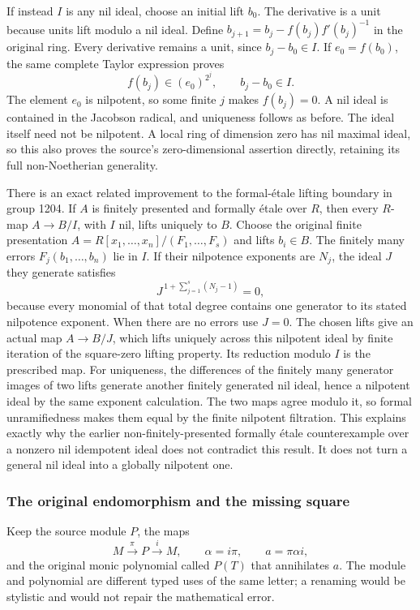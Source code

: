 If instead \(I\) is any nil ideal, choose an initial lift \(b_0\). The derivative is a unit because units lift modulo a nil ideal. Define \(b_{j+1}=b_j-f(b_j)f'(b_j)^{-1}\) in the original ring. Every derivative remains a unit, since \(b_j-b_0\in I\). If \(e_0=f(b_0)\), the same complete Taylor expression proves \[
f(b_j)\in(e_0)^{2^j},\qquad b_j-b_0\in I .
\] The element \(e_0\) is nilpotent, so some finite \(j\) makes \(f(b_j)=0\). A nil ideal is contained in the Jacobson radical, and uniqueness follows as before. The ideal itself need not be nilpotent. A local ring of dimension zero has nil maximal ideal, so this also proves the source's zero-dimensional assertion directly, retaining its full non-Noetherian generality.

There is an exact related improvement to the formal-étale lifting boundary in group 1204. If \(A\) is finitely presented and formally étale over \(R\), then every \(R\)-map \(A\to B/I\), with \(I\) nil, lifts uniquely to \(B\). Choose the original finite presentation \(A=R[x_1,\ldots,x_n]/(F_1,\ldots,F_s)\) and lifts \(b_i\in B\). The finitely many errors \(F_j(b_1,\ldots,b_n)\) lie in \(I\). If their nilpotence exponents are \(N_j\), the ideal \(J\) they generate satisfies \[
J^{\,1+\sum_{j=1}^s(N_j-1)}=0,
\] because every monomial of that total degree contains one generator to its stated nilpotence exponent. When there are no errors use \(J=0\). The chosen lifts give an actual map \(A\to B/J\), which lifts uniquely across this nilpotent ideal by finite iteration of the square-zero lifting property. Its reduction modulo \(I\) is the prescribed map. For uniqueness, the differences of the finitely many generator images of two lifts generate another finitely generated nil ideal, hence a nilpotent ideal by the same exponent calculation. The two maps agree modulo it, so formal unramifiedness makes them equal by the finite nilpotent filtration. This explains exactly why the earlier non-finitely-presented formally étale counterexample over a nonzero nil idempotent ideal does not contradict this result. It does not turn a general nil ideal into a globally nilpotent one.

\subsubsection{The original endomorphism and the missing square}\label{algebra-proof-058-the-original-endomorphism-and-the-missing-square}

Keep the source module \(P\), the maps \[
M\xrightarrow{\pi}P\xrightarrow{i}M,\qquad
\alpha=i\pi,\qquad a=\pi\alpha i,
\] and the original monic polynomial called \(P(T)\) that annihilates \(a\). The module and polynomial are different typed uses of the same letter; a renaming would be stylistic and would not repair the mathematical error.

